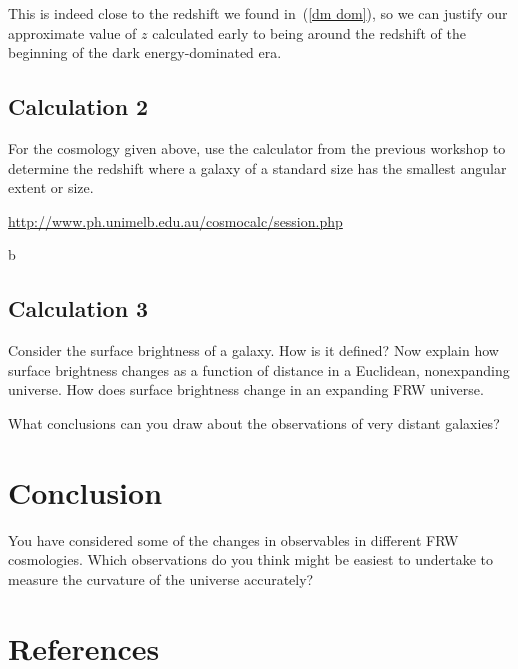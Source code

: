 \documentclass[a4paper]{article} %
\begin{document}
This is indeed close to the redshift we found in~(\ref{dm dom}), so we can justify our approximate value of $z$ calculated early to being around the redshift of the beginning of the dark energy-dominated era.	


\subsection{Calculation 2}
\begin{framed}
For the cosmology given above, use the calculator from the previous workshop to determine the redshift where a galaxy of a standard size has the smallest angular extent or size.

\url{http://www.ph.unimelb.edu.au/cosmocalc/session.php}
\end{framed}
b
\subsection{Calculation 3}
\begin{framed}
Consider the surface brightness of a galaxy. How is it defined? Now explain how surface brightness changes as a function of distance in a Euclidean, nonexpanding universe. How does surface brightness change in an expanding FRW universe.

What conclusions can you draw about the observations of very distant galaxies?
\end{framed}


\section{Conclusion}
\begin{framed}
You have considered some of the changes in observables in different FRW cosmologies. Which observations do you think might be easiest to undertake to measure the curvature of the universe accurately?
\end{framed}



\pagebreak

\section{References}



\end{document}

